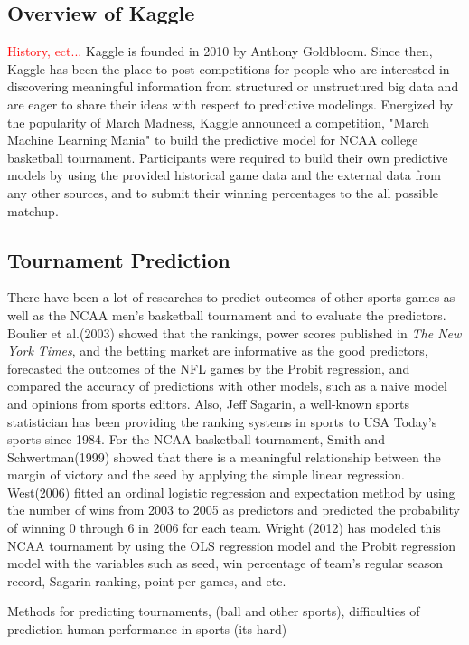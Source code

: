 \subsection{Overview of Kaggle}
\textcolor{red}{History, ect...}    
Kaggle is founded in 2010 by Anthony Goldbloom. Since then, Kaggle has been the place to post competitions for people who are interested in discovering meaningful information from structured or unstructured big data and are eager to share their ideas with respect to predictive modelings. Energized by the popularity of March Madness, Kaggle announced a competition, "March Machine Learning Mania" to build the predictive model for NCAA college basketball tournament. Participants were required to build their own predictive models by using the provided historical game data and the external data from any other sources, and to submit their winning percentages to the all possible matchup.

\subsection{Tournament Prediction}
There have been a lot of researches to predict outcomes of other sports games as well as the NCAA men's basketball tournament and to evaluate the predictors. Boulier et al.(2003) showed that the rankings, power scores published in \emph{The New York Times}, and the betting market are informative as the good predictors, forecasted the outcomes of the NFL games by the Probit regression, and compared the accuracy of predictions with other models, such as a naive model and opinions from sports editors. Also, Jeff Sagarin, a well-known sports statistician has been providing the ranking systems in sports to USA Today's sports since 1984. For the NCAA basketball tournament, Smith and Schwertman(1999) showed that there is a meaningful relationship between the margin of victory and the seed by applying the simple linear regression. West(2006) fitted an ordinal logistic regression and expectation method by using the number of wins from 2003 to 2005 as predictors and predicted the probability of winning 0 through 6 in 2006 for each team. Wright (2012) has modeled this NCAA tournament by using the OLS regression model and the Probit regression model with the variables such as seed, win percentage of team's regular season record, Sagarin ranking, point per games, and etc.

Methods for predicting tournaments, (ball and other sports), difficulties of prediction human performance in sports (its hard)
